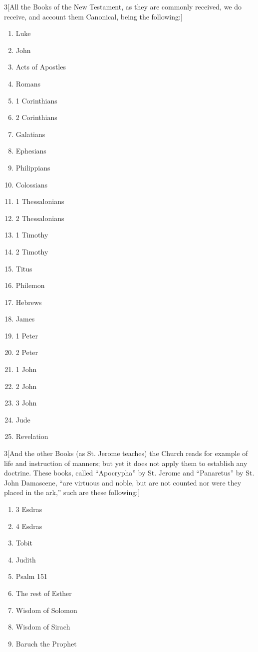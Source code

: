 \begin{enumerate}
\begin{enumerate}[i.]
\begin{multicols}{3}[All the Books of the New Testament, as they are commonly received, we do receive, and account them Canonical, being the following:]
\begin{enumerate}[1.]
		\item Luke
		\item John
		\item Acts of Apostles
		\item Romans
		\item 1 Corinthians
		\item 2 Corinthians
		\item Galatians
		\item Ephesians
		\item Philippians
		\item Colossians
		\item 1 Thessalonians
		\item 2 Thessalonians
		\item 1 Timothy
		\item 2 Timothy
		\item Titus
		\item Philemon
		\item Hebrews
		\item James
		\item 1 Peter
		\item 2 Peter
		\item 1 John
		\item 2 John
		\item 3 John
		\item Jude
		\item Revelation
	\end{enumerate}
	\end{multicols}
	\begin{multicols}{3}[And the other Books (as St. Jerome teaches) the Church reads for example of life and instruction of manners; but yet it does not apply them to establish any doctrine. These books, called ``Apocrypha'' by St. Jerome and ``Panaretus'' by St. John Damascene, ``are virtuous and noble, but are not counted nor were they placed in the ark,'' such are these following:]
		\begin{enumerate}[1.]
			\item 3 Esdras
			\item 4 Esdras
			\item Tobit
			\item Judith
			\item Psalm 151
			\item The rest of Esther
			\item Wisdom of Solomon
			\item Wisdom of Sirach
			\item Baruch the Prophet

\end{enumerate}
\end{multicols}
\end{enumerate}
\end{enumerate}
